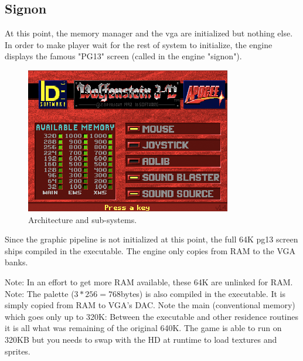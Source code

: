 \documentclass[book.tex]{subfiles}
\begin{document}
\subsection{Signon}
At this point, the memory manager and the vga are initialized but nothing else. In order to make player wait for the rest of system to initialize, the engine displays the famous "PG13" screen (called in the engine "signon").
\begin{figure}[H]
\centering
\includegraphics[width=\textwidth]{imgs/signon.png}
\caption{Architecture and sub-systems.}
\end{figure}
Since the graphic pipeline is not initialized at this point, the full 64K pg13 screen ships compiled in the executable. The engine only copies from RAM to the VGA banks.\\
\par 
\begin{minipage}{\textwidth}

\end{minipage}
Note: In an effort to get more RAM available, these 64K are unlinked for RAM.\\
Note: The palette ($3*256=768$bytes) is also compiled in the executable. It is simply copied from RAM to VGA's DAC.
Note the main (conventional memory) which goes only up to 320K: Between the executable and other residence routines it is all what was remaining of the original 640K. The game is able to run on 320KB but you needs to swap with the HD at runtime to load textures and sprites.
\end{document}
